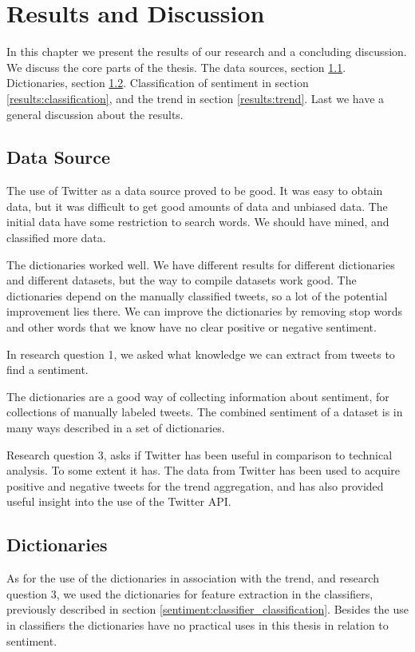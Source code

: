 \chapter{Results and Discussion}\label{results}

In this chapter we present the results of our research and a concluding
discussion.
We discuss the core parts of the thesis. The data sources,
section \ref{results:data_sources}. Dictionaries, section
\ref{results:dictionaries}. Classification of sentiment in section
\ref{results:classification}, and the trend in section \ref{results:trend}. Last
we have a general discussion about the results.  
%

\section{Data Source}\label{results:data_sources}
The use of Twitter as a data source proved to be good. It was easy to obtain
data, but it was difficult to get good amounts of data and unbiased data. The
initial data have some restriction to search words. We
should have mined, and classified more data. 

The dictionaries worked well. We have different results for
different dictionaries and different datasets, but the way to
compile datasets work good. The dictionaries depend on the manually classified
tweets, so a lot of the potential improvement lies there. We can
improve the dictionaries by removing stop words and other words that we know
have no clear positive or negative sentiment. 

In research question 1, we asked what knowledge we can
extract from tweets to find a sentiment. 

The dictionaries are a good way of collecting information about sentiment, for
collections of manually labeled tweets. 
The combined sentiment of a dataset is in many ways described in a set of
dictionaries. 
 
Research question 3, asks if Twitter has been useful in
comparison to technical analysis. To some extent it has. 
The data from Twitter has been
used to acquire positive and negative tweets for the trend aggregation, and has
also provided useful insight into the use of the Twitter API. 
%

\section{Dictionaries}\label{results:dictionaries}
As for the use of the dictionaries in association with the trend, and research
question 3, we used the dictionaries for feature
extraction in the classifiers, previously described in section
\ref{sentiment:classifier_classification}. Besides the use in classifiers the
dictionaries have no practical uses in this thesis in relation to sentiment.


